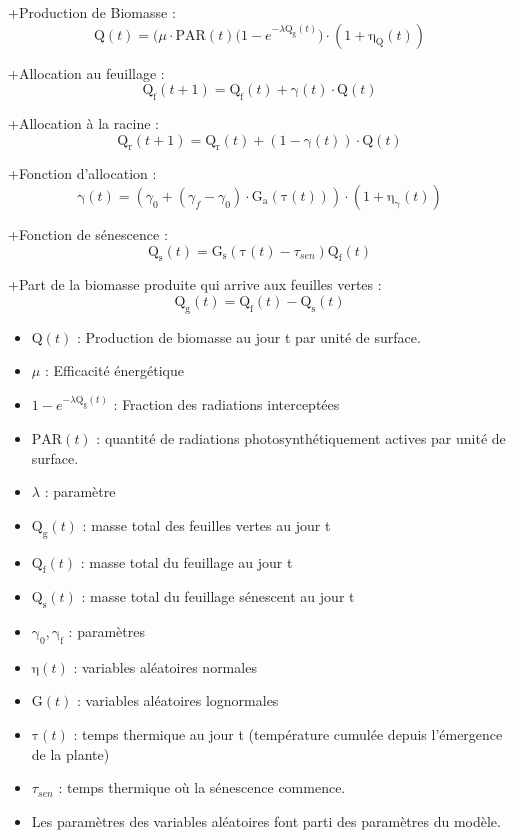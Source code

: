 +Production de Biomasse :
 \[ \mathrm{Q}(t) = \big(\mu\cdot\mathrm{PAR}(t)(1-e^{-\lambda\mathrm{Q_g}(t)}\big)\cdot(1+\mathrm{\eta_Q}(t)) \]
 
+Allocation au feuillage :
 \[ \mathrm{Q_f}(t+1) = \mathrm{Q_f}(t) + \mathrm{\gamma}(t)\cdot\mathrm{Q}(t) \]
 
+Allocation à la racine :
 \[ \mathrm{Q_r}(t+1) = \mathrm{Q_r}(t) + (1 -\mathrm{\gamma}(t))\cdot\mathrm{Q}(t) \]
 
+Fonction d'allocation :
 \[ \mathrm{\gamma}(t) = (\gamma_0 + (\gamma_f - \gamma_0)\cdot\mathrm{G_a}(\mathrm{\tau}(t)))\cdot(1+\mathrm{\eta_{\gamma}}(t)) \]
 
+Fonction de sénescence :
 \[ \mathrm{Q_s}(t) = \mathrm{G_s}(\mathrm{\tau}(t)- \tau_{sen})\mathrm{Q_f}(t) \]
 
+Part de la biomasse produite qui arrive aux feuilles vertes :
 \[\mathrm{Q_g}(t) = \mathrm{Q_f}(t) - \mathrm{Q_s}(t) \]
 
 \begin{itemize}
 
 \item $\mathrm{Q}(t)$ : Production de biomasse au jour t par unité de surface.
 \item $\mu$ : Efficacité énergétique
 \item $1-e^{-\lambda\mathrm{Q_g}(t)}$ : Fraction des radiations interceptées
 \item $\mathrm{PAR}(t)$ : quantité de radiations photosynthétiquement actives par unité de surface.
 \item $\lambda$ : paramètre
 \item $\mathrm{Q_g}(t)$ : masse total des feuilles vertes au jour t
 \item $\mathrm{Q_f}(t)$ : masse total du feuillage au jour t
 \item $\mathrm{Q_s}(t)$ : masse total du feuillage sénescent au jour t 
 \item $\mathrm{\gamma_0}, \mathrm{\gamma_f}$ : paramètres
 \item $\mathrm{\eta}(t)$ : variables aléatoires normales 
 \item $\mathrm{G}(t)$ : variables aléatoires lognormales
 \item $\mathrm{\tau}(t)$ : temps thermique au jour t (température cumulée depuis l'émergence de la plante)
 \item $\tau_{sen}$ : temps thermique où la sénescence commence.
 \item Les paramètres des variables aléatoires font parti des paramètres du modèle.
 
 \end{itemize}